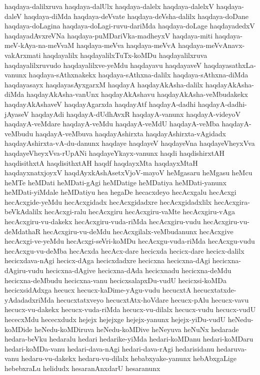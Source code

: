 {haqdaya-dalilxruva
haqdaya-dalUlx
haqdaya-dalelx
haqdaya-dalelxV
haqdaya-daleV
haqdaya-diMda
haqdaya-deVvate
haqdaya-deVsha-dalilx
haqdaya-doDane
haqdaya-doLagina
haqdaya-doLagi-ruvu-dariMda
haqdaya-doLage
haqdayadedxV
haqdayadAvxreVNa
haqdaya-puMDariVka-madheyxV
haqdaya-miti
haqdaya-meV-kAya-na-meVvaM
haqdaya-meVva
haqdaya-meVvA
haqdaya-meVvAnavx-vakArxmati
haqdayalilx
haqdayalilxTuTx-koMDu
haqdayalilxruva
haqdayalilxruvudo
haqdayalilxve-yeMdu
haqdayavu
haqdayaveV
haqdayasathxLa-vanunx
haqdaya-sAthxnakekx
haqdaya-sAthxna-dalilx
haqdaya-sAthxna-diMda
haqdayasayx
haqdayasAyxgarxM
haqdayA
haqdayAkAsha-dalilx
haqdayAkAsha-diMda
haqdayAkAsha-vanUnx
haqdayAkAshavu
haqdayAkAsha-veMbudakekx
haqdayAkAshaveV
haqdayAgarxda
haqdayAtf
haqdayA-dadhi
haqdayA-dadhi-jAyaseV
haqdayAdi
haqdayA-dUdhAvxR
haqdayA-vanunx
haqdayA-videyoV
haqdayA-veMdare
haqdayA-veMdu
haqdayA-veMdU
haqdayA-veMba
haqdayA-veMbudu
haqdayA-veMbuva
haqdayAshirxta
haqdayAshirxta-vAgidadx
haqdayAshirxta-vA-du-danunx
haqdaye
haqdayeV
haqdayeVna
haqdayeVheyxVva
haqdayeVheyxVva-rUpANi
haqdayeYkayx-vanunx
haqdi
haqdishirxtAH
haqdisithxtA
haqdisithxtAH
haqdf
haqdayxMta
haqdayxMtaH
haqdayxnatxjoyxV
haqdAyxkAshAsetxVjoV-mayoV
heMgasaru
heMgasu
heMcu
heMTe
heMDati
heMDati-gAgi
heMDatige
heMDatiya
heMDati-yanunx
heMDati-yiMdale
heMDatiyu
hea
hegaDe
hecacxdeyo
hecAcxgalu
hecAcxgi
hecAcxgide-yeMdu
hecAcxgidadx
hecAcxgidadxre
hecAcxgidadxlilx
hecAcxgira-beVkAdalilx
hecAcxgi-ralu
hecAcxgiru
hecAcxgiru-vaMte
hecAcxgiru-vAga
hecAcxgiru-vu-dakekx
hecAcxgiru-vuda-riMda
hecAcxgiru-vudu
hecAcxgiru-vu-deMdathaR
hecAcxgiru-vu-deMdu
hecAcxgilalx-veMbudanunx
hecAcxgive
hecAcxgi-ve-yeMdu
hecAcxgi-seVri-koMDu
hecAcxgu-vuda-riMda
hecAcxgu-vudu
hecAcxgu-vu-deMba
hecAcxda
hecAcx-dare
hecicxda
hecicx-dare
hecicx-dalilx
hecicxdava-nAgi
hecicx-dAga
hecicxdadxre
hecicxna
hecicxna-dAgi
hecicxna-dAgiru-vudu
hecicxna-dAgive
hecicxna-dAda
hecicxnadu
hecicxna-deMdu
hecicxna-deMbudu
hecicxna-vanu
hecicxsalapxDu-vudU
hecicxsi-koMDa
hecicxsidAdxga
hecucx
hecucx-kaDime-yAgu-vudu
hecucxtA
hecucxtatxde-yAdadadxriMda
hecucxtatxveyo
hecucxtAtx-hoVdare
hecucx-pAlu
hecucx-vavu
hecucx-vu-dakekx
hecucx-vuda-riMda
hecucx-vu-dilalx
hecucx-vudu
hecucx-vudU
hececxMdu
hececxdudx
hejejx
hejejxge
hejejx-yanunx
hejejx-yiDu-vudU
heNedu-koMDide
heNedu-koMDiruva
heNedu-koMDive
heNeyuva
heNuNx
hedarade
hedara-beVku
hedaralu
hedari
hedarike-yiMda
hedari-koMDanu
hedari-koMDaru
hedari-koMDa-vanu
hedari-dava-nAgi
hedari-dava-rAgi
hedarisidanu
hedaruva-vanu
hedaru-vu-dakekx
hedaru-vu-dilalx
hebabxyake-yanunx
hebAbxgaLige
hebebxraLu
helidudx
hesaranAnxdarU
hesaranunx
}
